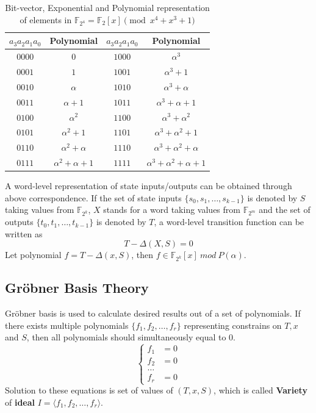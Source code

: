 \begin{table}[htb]
\centering
\caption{Bit-vector, Exponential and Polynomial representation of
elements in  ${\mathbb{F}}_{2^4} = {\mathbb{F}}_2[x]
\pmod{x^4+x^3+1}$}
\begin{tabular}{|c|c||c|c|} 
\hline
$a_3a_2a_1a_0$ & Polynomial     &$a_3a_2a_1a_0$ & Polynomial  \\
\hline
$0000$        & $0$           & $1000$  &$\alpha^3$\\
\hline
$0001$        & $1$           & $1001$  & $\alpha^3 + 1$\\
\hline
$0010$        &  $\alpha$       & $1010$ & $\alpha^3 + \alpha$  \\
\hline
$0011$        &  $\alpha + 1$   & $1011$ &  $\alpha^3+\alpha+1$\\
\hline
$0100$        &  $\alpha^2$     &  $1100$ &  $\alpha^3 + \alpha^2$\\
\hline
$0101$        & $\alpha^2 + 1$ & $1101$  & $\alpha^3+\alpha^2+1$\\
\hline
$0110$        &  $\alpha^2 + \alpha$ & $1110$ &  $\alpha^3+\alpha^2+\alpha$\\
\hline
$0111$        & $\alpha^2+\alpha+1$ & $1111$ & $\alpha^3+\alpha^2+\alpha+1$\\
\hline
\end{tabular}
\label{table:booltogalois}  
\end{table}
A word-level representation of state inputs/outputs can be obtained through above correspondence. If the set of 
state inputs $\{s_0, s_1, \dots, s_{k-1}\}$ is denoted by $S$ taking values from $\mathbb{F}_{2^k}$, $X$ stands
for a word taking values from $\mathbb F_{2^m}$ and
the set of outputs $\{t_0, t_1, \dots, t_{k-1}\}$ is denoted by $T$, a word-level transition function can be written as
\begin{displaymath}
T - \Delta(X, S) = 0
\end{displaymath}
Let polynomial $f = T - \Delta(x, S)$, then $f \in \mathbb{F}_{2^k}[x]\ mod\ P(\alpha)$.
\subsection{Gr\"obner Basis Theory}
Gr\"obner basis is used to calculate desired results out of a set of polynomials.
If there exists multiple polynomials $\{f_1, f_2, \dots, f_r\}$ representing constrains on $T, x$ and $S$,
then all polynomials should simultaneously equal to $0$.
\begin{displaymath}
\left\{
  \begin{array}{lc}
  f_1 & = 0\\
  f_2 & = 0\\
  \dots & \ \\
  f_r & = 0
  \end{array} \right.
\end{displaymath}
Solution to these equations is set of values of $(T, x, S)$, which is called \textbf{Variety} of \textbf{ideal}
$I = \langle f_1, f_2, \dots, f_r\rangle $.

